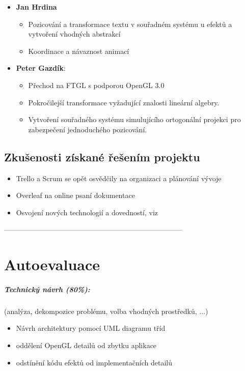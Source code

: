 \documentclass[12pt,a4paper,titlepage,final]{report}
\newcommand\AuthorA{Jan Hrdina}
\newcommand\AuthorB{Peter Gazdík}
\begin{document}
\begin{itemize}
\item \textbf{\AuthorA}
	\begin{itemize}
    \item Pozicování a transformace textu v souřadném systému u efektů a vytvoření vhodných abstrakcí
    \item Koordinace a návaznost animací
    \end{itemize}
\item \textbf{\AuthorB}:
\begin{itemize}
	\item Přechod na FTGL s podporou OpenGL 3.0
	\item Pokročilejší transformace vyžadující znalosti lineární algebry.
    \item Vytvoření souřadného systému simulujícího ortogonální projekci pro zabezpečení jednoduchého pozicování.
\end{itemize}
\end{itemize}

\section{Zkušenosti získané řešením projektu}

\begin{itemize}
\item Trello a Scrum se opět osvědčily na organizaci a plánování vývoje
\item Overleaf na online psaní dokumentace
\item Osvojení nových technologií a dovedností, viz 
\end{itemize}

---------------------------------------------------------------------------
\chapter{Autoevaluace}

\paragraph{Technický návrh (80\%):} (analýza, dekompozice problému, volba
vhodných prostředků, $\ldots$)

  \begin{itemize}
  \item Návrh architektury pomocí UML diagramu tříd
  \item oddělení OpenGL detailů od zbytku aplikace
  \item odstínění kódu efektů od implementačních detailů
  \end{itemize}
\end{document}
